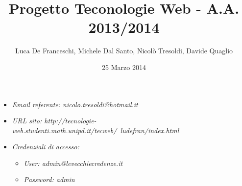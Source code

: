 \documentclass[a4paper]{article}
\title{Progetto Teconologie Web - A.A. 2013/2014}
\author{Luca De Franceschi, Michele Dal Santo, Nicolò Tresoldi, Davide Quaglio}
\date{25 Marzo 2014}
\begin{document}
\maketitle

\begin{mdframed}
\begin{itemize}
\item \emph{ Email referente: nicolo.tresoldi@hotmail.it }
\item \emph{ URL sito: http://tecnologie-web.studenti.math.unipd.it/tecweb/~ludefran/index.html}
\item \emph{ Credenziali di accesso: }
\begin{itemize}
\item \emph{User:  admin@levecchiecredenze.it}
\item \emph{Password: admin}
\end{itemize}
\end{itemize}
\end{mdframed}







\end{document}
